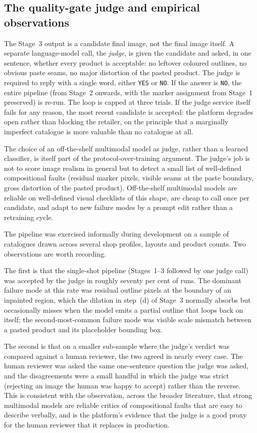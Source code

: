 \subsection{The quality-gate judge and empirical observations}
\label{subsec:hyb-judge}

The Stage~3 output is a candidate final image, not the final image itself. A separate language-model call, the \emph{judge}, is given the candidate and asked, in one sentence, whether every product is acceptable: no leftover coloured outlines, no obvious paste seams, no major distortion of the pasted product. The judge is required to reply with a single word, either \texttt{YES} or \texttt{NO}. If the answer is \texttt{NO}, the entire pipeline (from Stage~2 onwards, with the marker assignment from Stage~1 preserved) is re-run. The loop is capped at three trials. If the judge service itself fails for any reason, the most recent candidate is accepted: the platform degrades open rather than blocking the retailer, on the principle that a marginally imperfect catalogue is more valuable than no catalogue at all.

The choice of an off-the-shelf multimodal model as judge, rather than a learned classifier, is itself part of the protocol-over-training argument. The judge's job is not to score image realism in general but to detect a small list of well-defined compositional faults (residual marker pixels, visible seams at the paste boundary, gross distortion of the pasted product). Off-the-shelf multimodal models are reliable on well-defined visual checklists of this shape, are cheap to call once per candidate, and adapt to new failure modes by a prompt edit rather than a retraining cycle.

\label{subsec:hyb-empirical}
The pipeline was exercised informally during development on a sample of catalogues drawn across several shop profiles, layouts and product counts. Two observations are worth recording.

The first is that the single-shot pipeline (Stages~1--3 followed by one judge call) was accepted by the judge in roughly seventy per cent of runs. The dominant failure mode at this rate was residual outline pixels at the boundary of an inpainted region, which the dilation in step~(d) of Stage~3 normally absorbs but occasionally misses when the model emits a partial outline that loops back on itself; the second-most-common failure mode was visible scale mismatch between a pasted product and its placeholder bounding box.

The second is that on a smaller sub-sample where the judge's verdict was compared against a human reviewer, the two agreed in nearly every case. The human reviewer was asked the same one-sentence question the judge was asked, and the disagreements were a small handful in which the judge was strict (rejecting an image the human was happy to accept) rather than the reverse. This is consistent with the observation, across the broader literature, that strong multimodal models are reliable critics of compositional faults that are easy to describe verbally, and is the platform's evidence that the judge is a good proxy for the human reviewer that it replaces in production.

